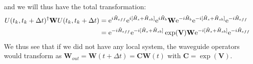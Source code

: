 and we will thus have the total transformation:
\begin{align}
    U(t_k,t_k+\Delta t)^\dagger \textbf{W} U(t_k,t_k+\Delta t) &=  \mathrm{e}^{i \Tilde{H}_{eff}} \mathrm{e}^{ i [ \Tilde{H}_{s} + \Tilde{H}_{sb}]}  \mathrm{e}^{ i \Tilde{H}_b } \textbf{W} \mathrm{e}^{ -i \Tilde{H}_b } \mathrm{e}^{ -i [ \Tilde{H}_{s} + \Tilde{H}_{sb}]} \mathrm{e}^{-i \Tilde{H}_{eff}} \\
    &= \mathrm{e}^{-i \Tilde{H}_{eff}} \mathrm{e}^{ -i [ \Tilde{H}_{s} + \Tilde{H}_{sb}]}  \exp(\textbf{V}) \textbf{W} \mathrm{e}^{ -i [ \Tilde{H}_{s} + \Tilde{H}_{sb}]} \mathrm{e}^{-i \Tilde{H}_{eff}}
\end{align}
We thus see that if we did not have any local system, the waveguide operators would transform as $\textbf{W}_{out} = \textbf{W}(t+\Delta t) = \textbf{C} \textbf{W}(t)$ with $\textbf{C}=\exp(\textbf{V})$.






